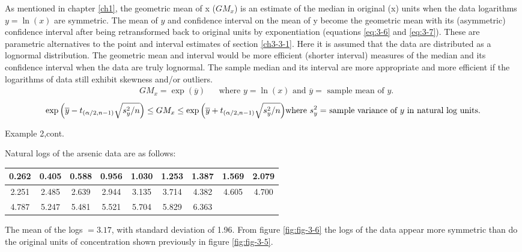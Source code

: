 \documentclass[]{book}
\begin{document}
As mentioned in chapter \ref{ch1}, the geometric mean of x (\(GM_{x}\)) is an estimate of the median in original (x) units when the data logarithms \(y = \ln{(x)}\) are symmetric. The mean of \(y\) and confidence interval on the mean of y become the geometric mean with its (asymmetric) confidence interval after being retransformed back to original units by exponentiation (equations \eqref{eq:3-6} and \eqref{eq:3-7}). These are parametric alternatives to the point and interval estimates of section \ref{ch3-3-1}. Here it is assumed that the data are distributed as a lognormal distribution. The geometric mean and interval would be more efficient (shorter interval) measures of the median and its confidence interval when the data are truly lognormal. The sample median and its interval are more appropriate and more efficient if the logarithms of data still exhibit skewness and/or outliers.
\begin{equation}
\begin{aligned}
& GM_{x} = \exp{\left( \overline{y} \right)} && \text{where $y = \ln{(x)}$ and $\overline{y} =$ sample mean of $y$.}
\end{aligned}
\label{eq:3-6}
\end{equation}
\begin{equation}
\exp{\left( \overline{y} - t_{(\alpha / 2, n - 1)} \sqrt{s^{2}_{y} / n} \right)} \leq GM_{x} \leq \exp{\left( \overline{y} + t_{(\alpha / 2, n - 1)} \sqrt{s^{2}_{y} / n}  \right)} \\
\text{where $s^{2}_{y} =$ sample variance of $y$ in natural log units.}
\label{eq:3-7}
\end{equation}

Example 2,cont.

Natural logs of the arsenic data are as follows:

\begin{longtable}[]{@{}ccccccccc@{}}
\toprule
0.262 & 0.405 & 0.588 & 0.956 & 1.030 & 1.253 & 1.387 & 1.569 & 2.079\tabularnewline
\midrule
\endhead
2.251 & 2.485 & 2.639 & 2.944 & 3.135 & 3.714 & 4.382 & 4.605 & 4.700\tabularnewline
4.787 & 5.247 & 5.481 & 5.521 & 5.704 & 5.829 & 6.363 & &\tabularnewline
\bottomrule
\end{longtable}

The mean of the logs \(= 3.17\), with standard deviation of 1.96. From figure \ref{fig:fig-3-6} the logs of the data appear more symmetric than do the original units of concentration shown previously in figure \ref{fig:fig-3-5}.
\end{document}
